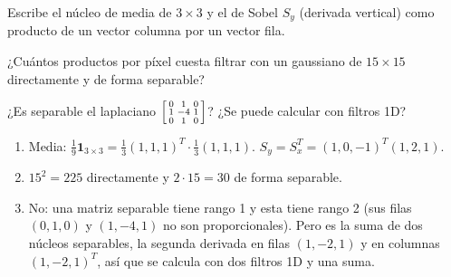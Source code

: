 \documentclass[11pt,a4paper]{scrartcl}
\begin{document}
\begin{ejercicio}[separabilidad]
  \begin{incisos}[1]
    \item Escribe el núcleo de media de $3\times3$ y el de Sobel $S_y$ (derivada vertical) como producto de un vector columna por un vector fila.
    \item ¿Cuántos productos por píxel cuesta filtrar con un gaussiano de $15\times15$ directamente y de forma separable?
    \item ¿Es separable el laplaciano $\begin{bsmallmatrix}0&1&0\\1&-4&1\\0&1&0\end{bsmallmatrix}$? ¿Se puede calcular con filtros 1D?
  \end{incisos}
\end{ejercicio}
\begin{solucion}
  \begin{enumerate}[label=\alph*)]
    \item Media: $\frac19\mathbf1_{3\times3}=\frac13(1,1,1)^T\cdot\frac13(1,1,1)$. $S_y=S_x^T=(1,0,-1)^T(1,2,1)$.
    \item $15^2=225$ directamente y $2\cdot15=30$ de forma separable.
    \item No: una matriz separable tiene rango 1 y esta tiene rango 2 (sus filas $(0,1,0)$ y $(1,-4,1)$ no son proporcionales). Pero es la suma de dos núcleos separables, la segunda derivada en filas $(1,-2,1)$ y en columnas $(1,-2,1)^T$, así que se calcula con dos filtros 1D y una suma.
  \end{enumerate}
\end{solucion}
\end{document}

